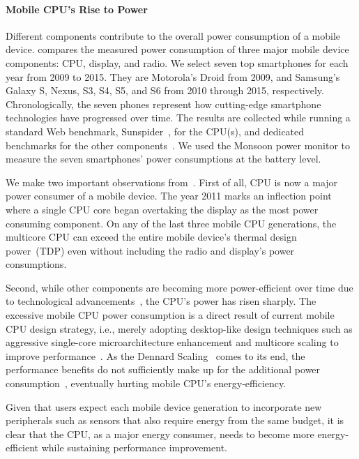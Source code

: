 \paragraph{Mobile CPU's Rise to Power} Different components contribute to the overall power consumption of a mobile device.  compares the measured power consumption of three major mobile device components: CPU, display, and radio. We select seven top smartphones for each year from 2009 to 2015. They are Motorola's Droid from 2009, and Samsung's Galaxy S, Nexus, S3, S4, S5, and S6 from 2010 through 2015, respectively. Chronologically, the seven phones represent how cutting-edge smartphone technologies have progressed over time. The results are collected while running a standard Web benchmark, Sunspider~\cite{sunspider}, for the CPU(s), and dedicated benchmarks for the other components~\cite{carroll2010analysis, ookla}. We used the Monsoon power monitor to measure the seven smartphones' power consumptions at the battery level.

We make two important observations from~. First of all, CPU is now a major power consumer of a mobile device. The year 2011 marks an inflection point where a single CPU core began overtaking the display as the most power consuming component. On any of the last three mobile CPU generations, the multicore CPU can exceed the entire mobile device's thermal design power~(TDP) even without including the radio and display's power consumptions.

Second, while other components are becoming more power-efficient over time due to technological advancements~\cite{chen2013energy}, the CPU's power has risen sharply. The excessive mobile CPU power consumption is a direct result of current mobile CPU design strategy, i.e., merely adopting desktop-like design techniques such as aggressive single-core microarchitecture enhancement and multicore scaling to improve performance~\cite{mobilecpu}. As the Dennard Scaling~\cite{dennard} comes to its end, the performance benefits do not sufficiently make up for the additional power consumption~\cite{mobilecpu}, eventually hurting mobile CPU's energy-efficiency.

Given that users expect each mobile device generation to incorporate new peripherals such as sensors that also require energy from the same budget, it is clear that the CPU, as a major energy consumer, needs to become more energy-efficient while sustaining performance improvement.

